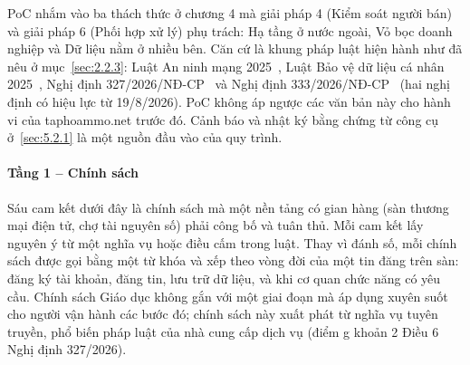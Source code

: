 PoC nhắm vào ba thách thức ở chương 4 mà giải pháp 4 (Kiểm soát người bán) và giải pháp 6 (Phối hợp xử lý) phụ trách: Hạ tầng ở nước ngoài, Vỏ bọc doanh nghiệp và Dữ liệu nằm ở nhiều bên. Căn cứ là khung pháp luật hiện hành như đã nêu ở mục~\ref{sec:2.2.3}: Luật An ninh mạng 2025~\cite{luat-anm-2025}, Luật Bảo vệ dữ liệu cá nhân 2025~\cite{luat-bvdlcn-2025}, Nghị định 327/2026/NĐ-CP~\cite{nd327-2026} và Nghị định 333/2026/NĐ-CP~\cite{nd333-2026} (hai nghị định có hiệu lực từ 19/8/2026). PoC không áp ngược các văn bản này cho hành vi của taphoammo.net trước đó. Cảnh báo và nhật ký bằng chứng từ công cụ ở~\ref{sec:5.2.1} là một nguồn đầu vào của quy trình.

\paragraph{Tầng 1 -- Chính sách}

Sáu cam kết dưới đây là chính sách mà một nền tảng có gian hàng (sàn thương mại điện tử, chợ tài nguyên số) phải công bố và tuân thủ. Mỗi cam kết lấy nguyên ý từ một nghĩa vụ hoặc điều cấm trong luật. Thay vì đánh số, mỗi chính sách được gọi bằng một từ khóa và xếp theo vòng đời của một tin đăng trên sàn: đăng ký tài khoản, đăng tin, lưu trữ dữ liệu, và khi cơ quan chức năng có yêu cầu. Chính sách Giáo dục không gắn với một giai đoạn mà áp dụng xuyên suốt cho người vận hành các bước đó; chính sách này xuất phát từ nghĩa vụ tuyên truyền, phổ biến pháp luật của nhà cung cấp dịch vụ (điểm g khoản 2 Điều 6 Nghị định 327/2026).

